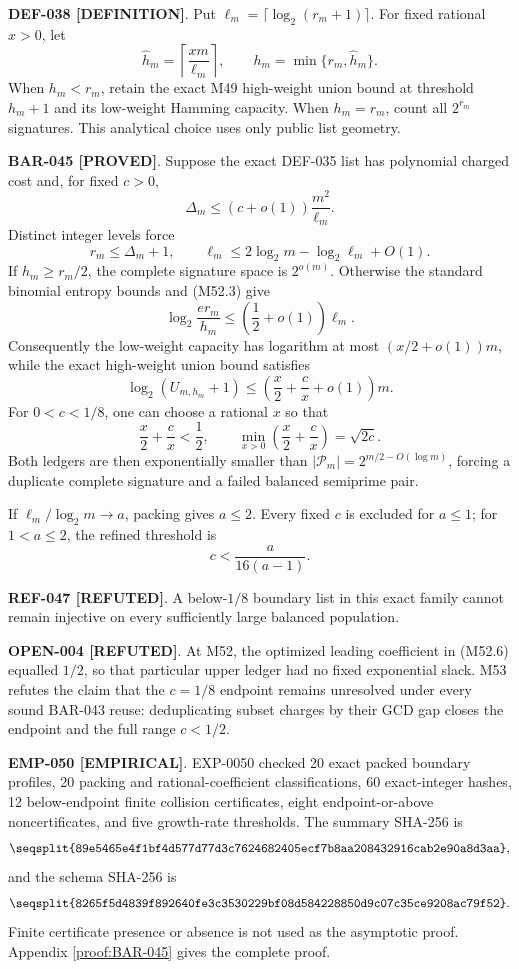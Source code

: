 \documentclass[11pt]{article}
\newcommand{\claimstatus}[2]{\textbf{#1 [#2]}}
\begin{document}
\claimstatus{DEF-038}{DEFINITION}. Put
\(\ell_m=\lceil\log_2(r_m+1)\rceil\). For fixed rational \(x>0\), let
\[
\widehat h_m=\left\lceil\frac{x m}{\ell_m}\right\rceil,
\qquad
h_m=\min\{r_m,\widehat h_m\}.
\tag{M52.1}
\]
When \(h_m<r_m\), retain the exact M49 high-weight union bound at threshold
\(h_m+1\) and its low-weight Hamming capacity. When \(h_m=r_m\), count all
\(2^{r_m}\) signatures. This analytical choice uses only public list
geometry.

\claimstatus{BAR-045}{PROVED}. Suppose the exact DEF-035 list has polynomial
charged cost and, for fixed \(c>0\),
\[
\Delta_m\le(c+o(1))\frac{m^2}{\ell_m}.
\tag{M52.2}
\]
Distinct integer levels force
\[
r_m\le\Delta_m+1,
\qquad
\ell_m\le2\log_2m-\log_2\ell_m+O(1).
\tag{M52.3}
\]
If \(h_m\ge r_m/2\), the complete signature space is \(2^{o(m)}\).
Otherwise the standard binomial entropy bounds and (M52.3) give
\[
\log_2\frac{e r_m}{h_m}
\le\left(\frac12+o(1)\right)\ell_m.
\tag{M52.4}
\]
Consequently the low-weight capacity has logarithm at most
\((x/2+o(1))m\), while the exact high-weight union bound satisfies
\[
\log_2(U_{m,h_m}+1)
\le
\left(\frac{x}{2}+\frac{c}{x}+o(1)\right)m.
\tag{M52.5}
\]
For \(0<c<1/8\), one can choose a rational \(x\) so that
\[
\frac{x}{2}+\frac{c}{x}<\frac12,
\qquad
\min_{x>0}\left(\frac{x}{2}+\frac{c}{x}\right)=\sqrt{2c}.
\tag{M52.6}
\]
Both ledgers are then exponentially smaller than
\(|\mathcal P_m|=2^{m/2-O(\log m)}\), forcing a duplicate complete
signature and a failed balanced semiprime pair.

If \(\ell_m/\log_2m\to a\), packing gives \(a\le2\). Every fixed \(c\)
is excluded for \(a\le1\); for \(1<a\le2\), the refined threshold is
\[
c<\frac{a}{16(a-1)}.
\tag{M52.7}
\]

\claimstatus{REF-047}{REFUTED}. A below-\(1/8\) boundary list in this exact
family cannot remain injective on every sufficiently large balanced
population.

\claimstatus{OPEN-004}{REFUTED}. At M52, the optimized leading coefficient
in (M52.6) equalled \(1/2\), so that particular upper ledger had no fixed
exponential slack. M53 refutes the claim that the \(c=1/8\) endpoint remains
unresolved under every sound BAR-043 reuse: deduplicating subset charges by
their GCD gap closes the endpoint and the full range \(c<1/2\).

\claimstatus{EMP-050}{EMPIRICAL}. EXP-0050 checked 20 exact packed boundary
profiles, 20 packing and rational-coefficient classifications, 60
exact-integer hashes, 12 below-endpoint finite collision certificates, eight
endpoint-or-above noncertificates, and five growth-rate thresholds. The
summary SHA-256 is
\[
\texttt{\seqsplit{89e5465e4f1bf4d577d77d3c7624682405ecf7b8aa208432916cab2e90a8d3aa}},
\]
and the schema SHA-256 is
\[
\texttt{\seqsplit{8265f5d4839f892640fe3c3530229bf08d584228850d9c07c35ce9208ac79f52}}.
\]
Finite certificate presence or absence is not used as the asymptotic proof.
Appendix \ref{proof:BAR-045} gives the complete proof.
\end{document}
